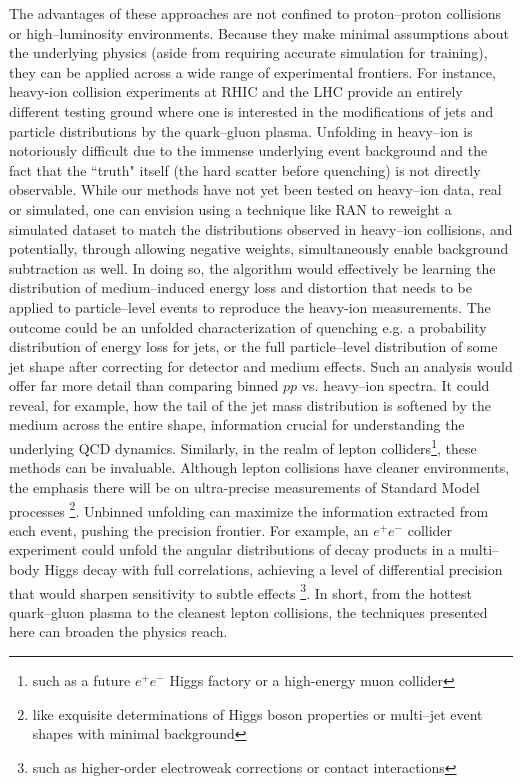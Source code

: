         The advantages of these approaches are not confined to proton--proton collisions or high--luminosity environments.
        Because they make minimal assumptions about the underlying physics (aside from requiring accurate simulation for training), they can be applied across a wide range of experimental frontiers.
        For instance, heavy-ion collision experiments at RHIC and the LHC provide an entirely different testing ground where one is interested in the modifications of jets and particle distributions by the quark--gluon plasma.
        Unfolding in heavy--ion is notoriously difficult due to the immense underlying event background and the fact that the ``truth" itself (the hard scatter before quenching) is not directly observable.
        While our methods have not yet been tested on heavy--ion data, real or simulated, one can envision using a technique like RAN to reweight a simulated dataset to match the distributions observed in heavy--ion collisions, and potentially, through allowing negative weights, simultaneously enable background subtraction as well.
        In doing so, the algorithm would effectively be learning the distribution of medium--induced energy loss and distortion that needs to be applied to particle--level events to reproduce the heavy-ion measurements.
        The outcome could be an unfolded characterization of quenching e.g. a probability distribution of energy loss for jets, or the full particle--level distribution of some jet shape after correcting for detector and medium effects.
        Such an analysis would offer far more detail than comparing binned $pp$ vs. heavy--ion spectra.
        It could reveal, for example, how the tail of the jet mass distribution is softened by the medium across the entire shape, information crucial for understanding the underlying QCD dynamics.
        Similarly, in the realm of lepton colliders\footnote{such as a future $e^+e^-$ Higgs factory or a high-energy muon collider}, these methods can be invaluable.
        Although lepton collisions have cleaner environments, the emphasis there will be on ultra-precise measurements of Standard Model processes \footnote{like exquisite determinations of Higgs boson properties or multi--jet event shapes with minimal background}.
        Unbinned unfolding can maximize the information extracted from each event, pushing the precision frontier.
        For example, an $e^+e^-$ collider experiment could unfold the angular distributions of decay products in a multi--body Higgs decay with full correlations, achieving a level of differential precision that would sharpen sensitivity to subtle effects \footnote{such as higher-order electroweak corrections or contact interactions}.
        In short, from the hottest quark--gluon plasma to the cleanest lepton collisions, the techniques presented here can broaden the physics reach.

